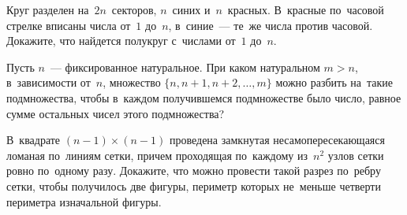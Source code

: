 \begin{problems}
\item
Круг разделен на~$2 n$~секторов, $n$~синих и~$n$~красных.
В~красные по~часовой стрелке вписаны числа от~$1$ до~$n$, в~синие~--- те~же
числа против часовой.
Докажите, что найдется полукруг с~числами от~$1$ до~$n$.

\item
Пусть $n$~--- фиксированное натуральное.
При каком натуральном $m > n$, в~зависимости от~$n$, множество
$\{ n, n + 1, n + 2, \ldots, m \}$ можно разбить на~такие подмножества, чтобы
в~каждом получившемся подмножестве было число, равное сумме остальных чисел
этого подмножества?

\item
В~квадрате $(n - 1) \times (n - 1)$ проведена замкнутая несамопересекающаяся
ломаная по~линиям сетки, причем проходящая по~каждому из~$n^2$ узлов сетки
ровно по~одному разу.
Докажите, что можно провести такой разрез по~ребру сетки, чтобы получилось
две фигуры, периметр которых не~меньше четверти периметра изначальной фигуры.

\end{problems}

